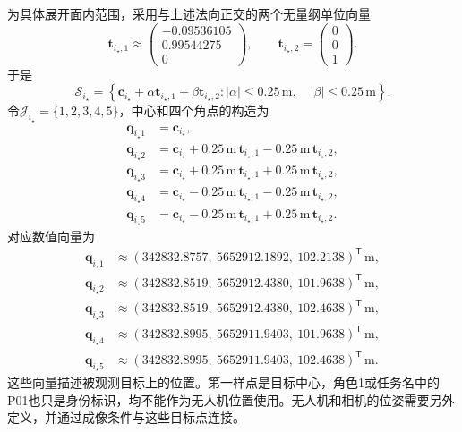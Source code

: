 为具体展开面内范围，采用与上述法向正交的两个无量纲单位向量
\begin{equation}
 \mathbf t_{i_\star,1}\approx
 \begin{pmatrix}
 -0.09536105\\0.99544275\\0
 \end{pmatrix},
 \qquad
 \mathbf t_{i_\star,2}=\begin{pmatrix}0\\0\\1\end{pmatrix}.
\end{equation}
于是
\begin{equation}
 \mathcal S_{i_\star}=
 \left\{\mathbf c_{i_\star}
 +\alpha\mathbf t_{i_\star,1}+\beta\mathbf t_{i_\star,2}:
 |\alpha|\leq0.25\,\mathrm m,\quad
 |\beta|\leq0.25\,\mathrm m\right\}.
\end{equation}
令$\mathcal J_{i_\star}=\{1,2,3,4,5\}$，中心和四个角点的构造为
\begin{equation}
 \begin{aligned}
 \mathbf q_{i_\star 1}&=\mathbf c_{i_\star},\\
 \mathbf q_{i_\star 2}&=\mathbf c_{i_\star}
 +0.25\,\mathrm m\,\mathbf t_{i_\star,1}
 -0.25\,\mathrm m\,\mathbf t_{i_\star,2},\\
 \mathbf q_{i_\star 3}&=\mathbf c_{i_\star}
 +0.25\,\mathrm m\,\mathbf t_{i_\star,1}
 +0.25\,\mathrm m\,\mathbf t_{i_\star,2},\\
 \mathbf q_{i_\star 4}&=\mathbf c_{i_\star}
 -0.25\,\mathrm m\,\mathbf t_{i_\star,1}
 -0.25\,\mathrm m\,\mathbf t_{i_\star,2},\\
 \mathbf q_{i_\star 5}&=\mathbf c_{i_\star}
 -0.25\,\mathrm m\,\mathbf t_{i_\star,1}
 +0.25\,\mathrm m\,\mathbf t_{i_\star,2}.
 \end{aligned}
\end{equation}
对应数值向量为
\begin{align}
 \mathbf q_{i_\star 1}&\approx
 (342832.8757,\ 5652912.1892,\ 102.2138)^{\mathsf T}\,\mathrm m,\\
 \mathbf q_{i_\star 2}&\approx
 (342832.8519,\ 5652912.4380,\ 101.9638)^{\mathsf T}\,\mathrm m,\\
 \mathbf q_{i_\star 3}&\approx
 (342832.8519,\ 5652912.4380,\ 102.4638)^{\mathsf T}\,\mathrm m,\\
 \mathbf q_{i_\star 4}&\approx
 (342832.8995,\ 5652911.9403,\ 101.9638)^{\mathsf T}\,\mathrm m,\\
 \mathbf q_{i_\star 5}&\approx
 (342832.8995,\ 5652911.9403,\ 102.4638)^{\mathsf T}\,\mathrm m.
\end{align}
这些向量描述被观测目标上的位置。第一样点是目标中心，角色1或任务名中的P01也只是身份标识，均不能作为无人机位置使用。无人机和相机的位姿需要另外定义，并通过成像条件与这些目标点连接。

